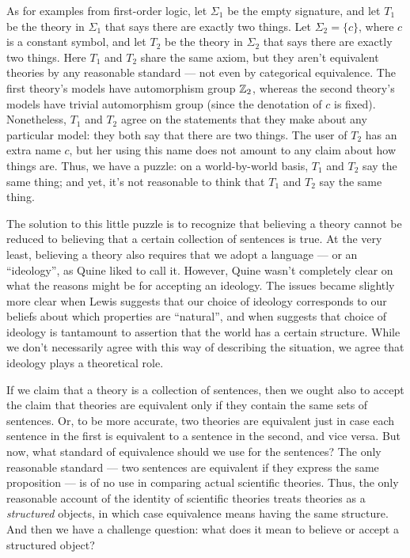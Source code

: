 As for examples from first-order logic, let $\Sigma _1$ be the empty
signature, and let $T_1$ be the theory in $\Sigma _1$ that says there
are exactly two things.  Let $\Sigma _2=\{ c\}$, where $c$ is a
constant symbol, and let $T_2$ be the theory in $\Sigma _2$ that says
there are exactly two things.  Here $T_1$ and $T_2$ share the same
axiom, but they aren't equivalent theories by any reasonable standard
--- not even by categorical equivalence.  The first theory's models
have automorphism group $\mathbb Z _2$, whereas the second theory's models
have trivial automorphism group (since the denotation of $c$ is
fixed).  Nonetheless, $T_1$ and $T_2$ agree on the statements that
they make about any particular model: they both say that there are two
things.  The user of $T_2$ has an extra name $c$, but her using this
name does not amount to any claim about how things are.  Thus, we have
a puzzle: on a world-by-world basis, $T_1$ and $T_2$ say the same
thing; and yet, it's not reasonable to think that $T_1$ and $T_2$ say
the same thing.

The solution to this little puzzle is to recognize that believing a
theory cannot be reduced to believing that a certain collection of
sentences is true.  At the very least, believing a theory also
requires that we adopt a language --- or an ``ideology'', as Quine
liked to call it.  However, Quine wasn't completely clear on what the
reasons might be for accepting an ideology.  The issues became
slightly more clear when Lewis suggests that our choice of ideology
corresponds to our beliefs about which properties are ``natural'', and
when \cite{sider2013} suggests that choice of ideology is tantamount
to assertion that the world has a certain structure.  While we don't
necessarily agree with this way of describing the situation, we agree
that ideology plays a theoretical role.

If we claim that a theory is a collection of sentences, then we ought
also to accept the claim that theories are equivalent only if they
contain the same sets of sentences.  Or, to be more accurate, two
theories are equivalent just in case each sentence in the first is
equivalent to a sentence in the second, and vice versa.  But now, what
standard of equivalence should we use for the sentences?  The only
reasonable standard --- two sentences are equivalent if they express
the same proposition --- is of no use in comparing actual scientific
theories.  Thus, the only reasonable account of the identity of
scientific theories treats theories as a {\it structured} objects, in
which case equivalence means having the same structure.  And then we
have a challenge question: what does it mean to believe or accept a
structured object?

